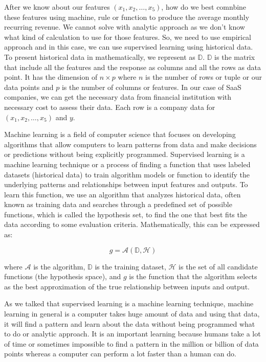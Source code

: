 \documentclass[12pt]{article}
\begin{document}
After we know about our features $(x_1, x_2, \dots, x_5)$, how do we best comnbine these features using machine, rule or function to produce the average monthly recurring revenue. We cannot solve with analytic approach as we don't know what kind of calculation to use for those features. So, we need to use empirical approach and in this case, we can use supervised learning using historical data. To present historical data in mathematically, we represent as $\mathbb{D}$. $\mathbb{D}$ is the matrix that include all the features and the response as columns and all the rows as data point. It has the dimension of $n \times p$ where $n$ is the number of rows or tuple or our data points and $p$ is the number of columns or features. In our case of SaaS companies, we can get the necessary data from financial institution with necessary cost to assess their data. Each row is a company data for $(x_1, x_2, \dots, x_5)$ and $y$. 

Machine learning is a field of computer science that focuses on developing algorithms that allow computers to learn patterns from data and make decisions or predictions without being explicitly programmed. Supervised learning is a machine learning technique or a process of finding a function that uses labeled datasets (historical data) to train algorithm models or function to identify the underlying patterns and relationships between input features and outputs. To learn this function, we use an algorithm that analyzes historical data, often known as training data and searches through a predefined set of possible functions, which is called the hypothesis set, to find the one that best fits the data according to some evaluation criteria. Mathematically, this can be expressed as:

\[
g = \mathcal{A}(\mathbb{D}, \mathcal{H})
\]

where $\mathcal{A}$ is the algorithm, $\mathbb{D}$ is the training dataset, $\mathcal{H}$ is the set of all candidate functions (the hypothesis space), and $g$ is the function that the algorithm selects as the best approximation of the true relationship between inputs and output. 

As we talked that supervised learning is a machine learning technique, machine learning in general is a computer takes huge amount of data and using that data, it will find a pattern and learn about the data without being programmed what to do or analytic approach. It is an important learning because humans take a lot of time or sometimes impossible to find a pattern in the million or billion of data points whereas a computer can perform a lot faster than a human can do. 
\end{document}

